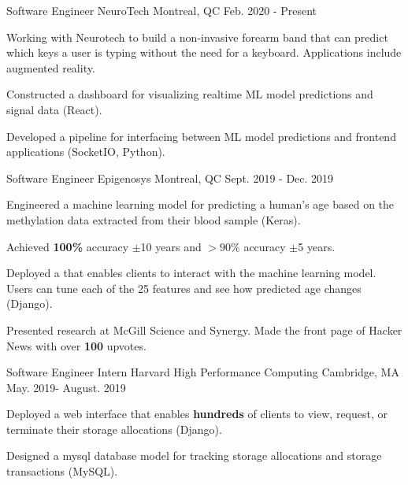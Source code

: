 \begin{cventries}
  \cventry
    {Software Engineer} %
    {NeuroTech} %
    {Montreal, QC} %
    {Feb. 2020 - Present} %
    {
      \begin{cvitems} %
      \item {Working with Neurotech to build a non-invasive forearm band that can predict which keys a user is typing without the need for a keyboard. Applications include augmented reality.}
      \item {Constructed a dashboard for visualizing realtime ML model predictions and signal data (React).}
      \item {Developed a pipeline for interfacing between ML model predictions and frontend applications (SocketIO, Python).}
      \end{cvitems}
    }

  \cventry
    {Software Engineer} %
    {Epigenosys} %
    {Montreal, QC} %
    {Sept. 2019 - Dec. 2019} %
    {
      \begin{cvitems} %
      \item {Engineered a machine learning model for predicting a human's age based on the methylation data extracted from their blood sample (Keras).}
      \item {Achieved \textbf{100\%} accuracy $\pm$10 years and $>90\%$ accuracy $\pm$5 years.}
      \item {Deployed a  that enables clients to interact with the machine learning model. Users can tune each of the 25 features and see how predicted age changes (Django).}
      \item {Presented research at McGill Science and Synergy. Made the front page of Hacker News with over \textbf{100} upvotes.}
      \end{cvitems}
    }

  \cventry
    {Software Engineer Intern} %
    {Harvard High Performance Computing} %
    {Cambridge, MA} %
    {May. 2019- August. 2019} %
    {
      \begin{cvitems} %
      \item {Deployed a web interface that enables \textbf{hundreds} of clients to view, request, or terminate their storage allocations (Django).}
      \item {Designed a mysql database model for tracking storage allocations and storage transactions (MySQL).}
      \end{cvitems}
    }


\end{cventries}
